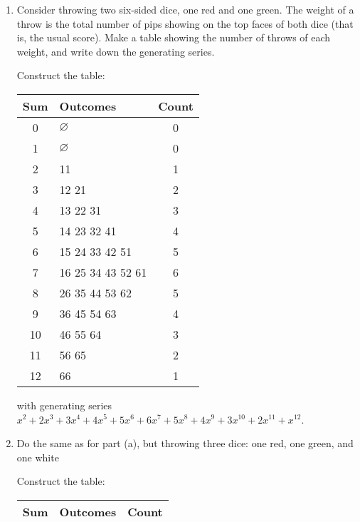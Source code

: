 \begin{enumerate}
  \item Consider throwing two six-sided dice, one red and one green.
        The weight of a throw is the total number of pips showing on
        the top faces of both dice (that is, the usual score).
        Make a table showing the number of throws of each weight,
        and write down the generating series.
        \begin{sol}
          Construct the table:
          \begin{center}
            \begin{tabular}{c|l|c}
              Sum & Outcomes          & Count \\ \hline
              0   & $\varnothing$     & 0     \\
              1   & $\varnothing$     & 0     \\
              2   & 11                & 1     \\
              3   & 12 21             & 2     \\
              4   & 13 22 31          & 3     \\
              5   & 14 23 32 41       & 4     \\
              6   & 15 24 33 42 51    & 5     \\
              7   & 16 25 34 43 52 61 & 6     \\
              8   & 26 35 44 53 62    & 5     \\
              9   & 36 45 54 63       & 4     \\
              10  & 46 55 64          & 3     \\
              11  & 56 65             & 2     \\
              12  & 66                & 1
            \end{tabular}
          \end{center}
          with generating series $x^2+2x^3+3x^4+4x^5+5x^6+6x^7+5x^8+4x^9+3x^{10}+2x^{11}+x^{12}$.
        \end{sol}
  \item Do the same as for part (a), but throwing three dice:
        one red, one green, and one white
        \begin{sol}
          Construct the table:
          \begin{center}
            \tiny\begin{tabular}{c|l|c}
              Sum & Outcomes                                                                                                    & Count \\ \hline

\end{tabular}
\end{center}
\end{sol}
\end{enumerate}
